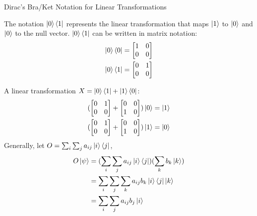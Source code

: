 \documentclass{beamer}
\begin{document}
\begin{frame}{Dirac's Bra/Ket Notation for Linear Transformations}
  {\tiny
  The notation $\ket{0}\bra{1}$ represents the linear transformation that maps $\ket{1}$ to $\ket{0}$ and $\ket{0}$ to the null vector.
  $\ket{0}\bra{1}$ can be written in matrix notation:
    \begin{align*}
      \ket{0}\bra{0} &= \begin{bmatrix}
                        1 & 0 \\
                        0 & 0
                        \end{bmatrix} \\
      \ket{0}\bra{1} &= \begin{bmatrix}
                        0 & 1 \\
                        0 & 0
                        \end{bmatrix}
    \end{align*}

  A linear transformation $X=\ket{0}\bra{1} + \ket{1}\bra{0}$:
    \begin{align*}
      (\begin{bmatrix}
       0 & 1 \\
       0 & 0
       \end{bmatrix}
       + 
       \begin{bmatrix}
       0 & 0 \\
       1 & 0
       \end{bmatrix}) \ket{0} = \ket{1} \\
      (\begin{bmatrix}
       0 & 1 \\
       0 & 0
       \end{bmatrix}
       + 
       \begin{bmatrix}
       0 & 0 \\
       1 & 0
       \end{bmatrix}) \ket{1} = \ket{0}
    \end{align*}
  Generally, let $O = \sum_{i}\sum_{j}a_{ij}\ket{i}\bra{j}$,
    \begin{align*}
      O\ket{\psi} &= (\sum_{i}\sum_{j}a_{ij}\ket{i}\bra{j}) (\sum_{k}b_{k}\ket{k}) \\
                  &= \sum_{i}\sum_{j}\sum_{k} a_{ij}b_{k}\ket{i}\bra{j}\ket{k} \\
                  &= \sum_{i}\sum_{j}a_{ij}b_{j}\ket{i}
    \end{align*}
  }%
\end{frame}
\end{document}
